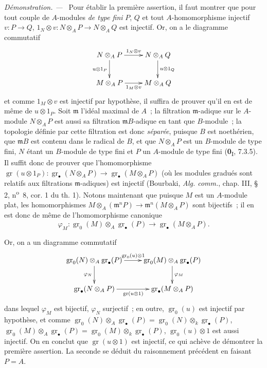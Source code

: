 \documentclass[10pt,oneside]{book}
\newcommand{\oldpage}[2][]{%
  \setcounter{footnote}{0}%
  \marginpar{\scriptsize\textbf{#1}~|~#2}\ignorespaces}
\newenvironment{proof}{%
  \par\medskip\noindent\textit{Démonstration. ---\ }}{\par}
\begin{document}
\begin{proof}
Pour établir la première assertion, il faut montrer que pour tout couple de
$A$-modules \emph{de type fini} $P$, $Q$ et tout $A$-homomorphisme injectif
$v:P\to Q$,
$1_N\otimes v:N\otimes_AP\to N\otimes_AQ$ est injectif. Or, on a le
diagramme commutatif
\[
\xymatrix{
N\otimes_AP\ar[r]^{1_N\otimes v}\ar[d]_{u\otimes1_P}
  &N\otimes_AQ\ar[d]^{u\otimes1_Q}\\
M\otimes_AP\ar[r]_{1_M\otimes v}
  &M\otimes_AQ
}
\]
et comme $1_M\otimes v$ est injectif par hypothèse, il suffira de prouver
qu'il en est de même de $u\otimes1_P$. Soit $\mathfrak m$ l'idéal maximal
de $A$~; la filtration $\mathfrak m$-adique sur le $A$-module
$N\otimes_AP$ est aussi sa filtration $\mathfrak mB$-adique en tant que
$B$-module~; la topologie définie par cette filtration est donc \emph{séparée},
puisque $B$ est noethérien, que $\mathfrak mB$ est contenu dans le radical de
$B$, et que $N\otimes_AP$ est un $B$-module de type fini, $N$ étant un
$B$-module de type fini et $P$ un $A$-module de type fini
(\textbf{0}\textsubscript{I}, 7.3.5). Il suffit donc de prouver que l'homomorphisme
$\operatorname{gr}(u\otimes1_P):
\operatorname{gr}_\bullet(N\otimes_AP)
\longrightarrow
\operatorname{gr}_\bullet(M\otimes_AP)$
(où les modules gradués sont relatifs aux filtrations $\mathfrak m$-adiques)
est injectif (Bourbaki, \emph{Alg. comm.}, chap. III, \S\,2, n\textsuperscript{o}~8, cor. 1 du
th. 1). Notons maintenant que puisque $M$ est un $A$-module plat, les
homomorphismes
$M\otimes_A(\mathfrak m^nP)
\longrightarrow
\mathfrak m^n(M\otimes_AP)$
sont bijectifs~; il en est donc de même de l'homomorphisme canonique
\[
\varphi_M:
\operatorname{gr}_0(M)\otimes_A\operatorname{gr}_\bullet(P)
\longrightarrow
\operatorname{gr}_\bullet(M\otimes_AP).
\]

\oldpage[III]{144}

Or, on a un diagramme commutatif
\[
\xymatrix{
\operatorname{gr}_0(N)\otimes_A\operatorname{gr}_\bullet(P)
  \ar[r]^{\operatorname{gr}_0(u)\otimes1}\ar[d]_{\varphi_N}
  &\operatorname{gr}_0(M)\otimes_A\operatorname{gr}_\bullet(P)
  \ar[d]^{\varphi_M}\\
\operatorname{gr}_\bullet(N\otimes_AP)
  \ar[r]_{\operatorname{gr}(u\otimes1)}
  &\operatorname{gr}_\bullet(M\otimes_AP)
}
\]
dans lequel $\varphi_M$ est bijectif, $\varphi_N$ surjectif~; en outre,
$\operatorname{gr}_0(u)$ est injectif par hypothèse, et comme
$\operatorname{gr}_0(N)\otimes_A\operatorname{gr}_\bullet(P)
=\operatorname{gr}_0(N)\otimes_k\operatorname{gr}_\bullet(P)$,
$\operatorname{gr}_0(M)\otimes_A\operatorname{gr}_\bullet(P)
=\operatorname{gr}_0(M)\otimes_k\operatorname{gr}_\bullet(P)$,
$\operatorname{gr}_0(u)\otimes1$ est aussi injectif. On en conclut que
$\operatorname{gr}(u\otimes1)$ est injectif, ce qui achève de démontrer la
première assertion. La seconde se déduit du raisonnement précédent en faisant
$P=A$.
\end{proof}
\end{document}
